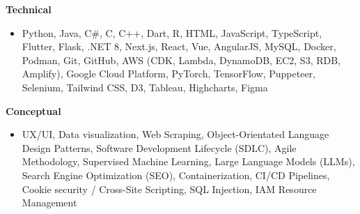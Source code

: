 \textbf{Technical}
\begin{itemize}[leftmargin=1.5em, nosep, noitemsep] %
    \item[] Python, Java, C\#, C, C++, Dart, R, HTML, JavaScript, TypeScript, Flutter, Flask, .NET 8, Next.js, React, Vue, AngularJS, MySQL, Docker, Podman, Git, GitHub, AWS (CDK, Lambda, DynamoDB, EC2, S3, RDB, Amplify), Google Cloud Platform, PyTorch, TensorFlow, Puppeteer, Selenium, Tailwind CSS, D3, Tableau, Highcharts, Figma
\end{itemize}
\textbf{Conceptual}
\begin{itemize}[leftmargin=1.5em, nosep, noitemsep] %
    \item[] UX/UI, Data visualization, Web Scraping, Object-Orientated Language Design Patterns, Software Development Lifecycle (SDLC), Agile Methodology, Supervised Machine Learning, Large Language Models (LLMs), Search Engine Optimization (SEO), Containerization, CI/CD Pipelines, Cookie security / Cross-Site Scripting, SQL Injection, IAM Resource Management
\end{itemize}